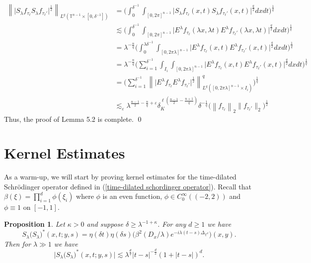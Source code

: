 \documentclass[11pt]{amsart}
\numberwithin{equation}{section}
\newcommand{\Tn}{\mathbb{T}^{n-1}}
\newcommand{\la}{\lambda}
\newcommand\norm[1]{\left\lVert#1\right\rVert}
\newcommand{\lpnorm}[3]{\norm{#1}_{L^{#2}(#3)}}
\newcommand{\altlpnorm}[2]{\norm{#1}_{#2}}
\newcommand{\T}[1][]{\mathbb{T}^#1}
\newcommand{\laplac}[1]{\Delta_{#1}}
\newcommand{\Sl}{S_{\la}}
\newcommand{\extensionop}[2]{E_{#1}^{\la}{#2}}
\newcommand{\dK}[1]{\delta_{K}^{#1}}
\newtheorem{proposition}{Proposition}[section]
\begin{document}
\begin{equation}
\begin{split}
    \lpnorm{\big|\Sl f_{\tau_{\ell}} \Sl f_{\tau_{\ell}'}\big|^{\frac{1}{2}}}{q}{\Tn \times [0, \delta^{-1}]} &= \Big(\int_{0}^{\delta^{-1}}\int_{[0,2\pi]^{n-1}} \big|\Sl f_{\tau_{\ell}}(x,t)\Sl f_{\tau_{\ell}'}(x,t)\big|^{\frac{q}{2}}dxdt \Big)^{\frac{1}{q}} \\
    &\lesssim \Big( \int_{0}^{\delta^{-1}} \int_{[0,2\pi]^{n-1}} \big| \extensionop{}{f_{\tau_{\ell}}}(\la x, \la t)\extensionop{}{f_{\tau_{\ell}'}}(\la x,\la t)\big|^{\frac{q}{2}}dxdt\Big)^{\frac{1}{q}} \\
    &=  \la^{-\frac{n}{q}}\Big( \int_{0}^{\la \delta^{-1}} \int_{[0,2\pi \la]^{n-1}} \big| \extensionop{}{f_{\tau_{\ell}}}(x, t)\extensionop{}{f_{\tau_{\ell}'}}(x,t)\big|^{\frac{q}{2}}dxdt\Big)^{\frac{1}{q}} \\
    &= \la^{-\frac{n}{q}}\Big(\sum_{i = 1}^{\delta^{-1}} \int_{I_i} \int_{[0,2\pi\la]^{n-1}} \big| \extensionop{}{f_{\tau_{\ell}}}(x, t)\extensionop{}{f_{\tau_{\ell}'}}(x,t)\big|^{\frac{q}{2}}dxdt\Big)^{\frac{1}{q}} \\
    &= \Big( \sum_{i = 1}^{\delta^{-1}}\lpnorm{ \big|\extensionop{}{f_{\tau_{\ell}}} \extensionop{}{f_{\tau_{\ell}'}}\big|^{\frac{1}{2}}}{q}{[0,2\pi \la]^{n-1} \times I_i}^q\Big)^{\frac{1}{q}} \\
    &\lesssim_{\varepsilon} \la^{\frac{n-1}{2} - \frac{n}{q} + \varepsilon}\dK{\ell(\frac{n-1}{2} - \frac{n+1}{q})}\delta^{-\frac{1}{q}}\Big( \altlpnorm{f_{\tau_{\ell}}}{2} \lVert f_{\tau_{\ell}'}\rVert_{2}\Big)^{\frac{1}{2}}
\end{split}
\end{equation}
Thus, the proof of Lemma 5.2 is complete.
\qed

\section{Kernel Estimates}
As a warm-up, we will start by proving kernel estimates for the time-dilated Schr\"{o}dinger operator defined in (\ref{time-dilated schordinger operator}). Recall that $\beta(\xi) = \prod_{i = 1}^{d}\phi(\xi_i)$ where $\phi$ is an even function, $\phi \in C_{0}^{\infty}((-2,2))$ and $\phi \equiv 1$ on $[-1,1]$.
\begin{proposition}
    Let $\kappa > 0$ and suppose $\delta \geq \la^{-1 + \kappa}$. For any $d \geq 1$ we have
    \begin{equation}
        \Sl\big(\Sl\big)^*(x,t;y,s) = \eta(\delta t)\eta(\delta s)\big(\beta^2(D_x/\la)e^{-i\la(t-s)\laplac{\T{d}}}\big)(x,y).
    \end{equation}
    Then for $\la \gg 1$ we have
    \begin{equation}
        \big| \Sl\big(\Sl\big)^*(x,t;y,s) \big| \lesssim\la^{\frac{d}{2}}|t-s|^{-\frac{d}{2}}(1 + |t-s|)^{d}.
    \end{equation}
\end{proposition}
\end{document}
